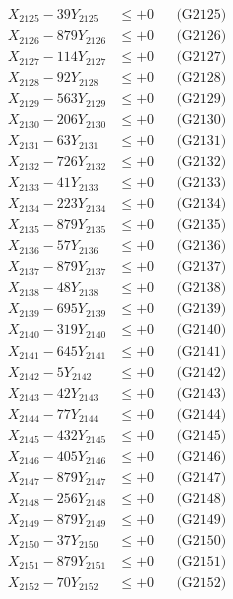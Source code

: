 \documentclass[a4paper,10pt]{article}
\begin{document}
{\begin{align}
X_{2125} - 39Y_{2125} &\leq +0 && \text{(G2125)} \\
X_{2126} - 879Y_{2126} &\leq +0 && \text{(G2126)} \\
X_{2127} - 114Y_{2127} &\leq +0 && \text{(G2127)} \\
X_{2128} - 92Y_{2128} &\leq +0 && \text{(G2128)} \\
X_{2129} - 563Y_{2129} &\leq +0 && \text{(G2129)} \\
X_{2130} - 206Y_{2130} &\leq +0 && \text{(G2130)} \\
\allowbreak
X_{2131} - 63Y_{2131} &\leq +0 && \text{(G2131)} \\
X_{2132} - 726Y_{2132} &\leq +0 && \text{(G2132)} \\
X_{2133} - 41Y_{2133} &\leq +0 && \text{(G2133)} \\
X_{2134} - 223Y_{2134} &\leq +0 && \text{(G2134)} \\
X_{2135} - 879Y_{2135} &\leq +0 && \text{(G2135)} \\
X_{2136} - 57Y_{2136} &\leq +0 && \text{(G2136)} \\
X_{2137} - 879Y_{2137} &\leq +0 && \text{(G2137)} \\
X_{2138} - 48Y_{2138} &\leq +0 && \text{(G2138)} \\
X_{2139} - 695Y_{2139} &\leq +0 && \text{(G2139)} \\
X_{2140} - 319Y_{2140} &\leq +0 && \text{(G2140)} \\
\allowbreak
X_{2141} - 645Y_{2141} &\leq +0 && \text{(G2141)} \\
X_{2142} - 5Y_{2142} &\leq +0 && \text{(G2142)} \\
X_{2143} - 42Y_{2143} &\leq +0 && \text{(G2143)} \\
X_{2144} - 77Y_{2144} &\leq +0 && \text{(G2144)} \\
X_{2145} - 432Y_{2145} &\leq +0 && \text{(G2145)} \\
X_{2146} - 405Y_{2146} &\leq +0 && \text{(G2146)} \\
X_{2147} - 879Y_{2147} &\leq +0 && \text{(G2147)} \\
X_{2148} - 256Y_{2148} &\leq +0 && \text{(G2148)} \\
X_{2149} - 879Y_{2149} &\leq +0 && \text{(G2149)} \\
X_{2150} - 37Y_{2150} &\leq +0 && \text{(G2150)} \\
\allowbreak
X_{2151} - 879Y_{2151} &\leq +0 && \text{(G2151)} \\
X_{2152} - 70Y_{2152} &\leq +0 && \text{(G2152)} \\

\end{align}}
\end{document}
